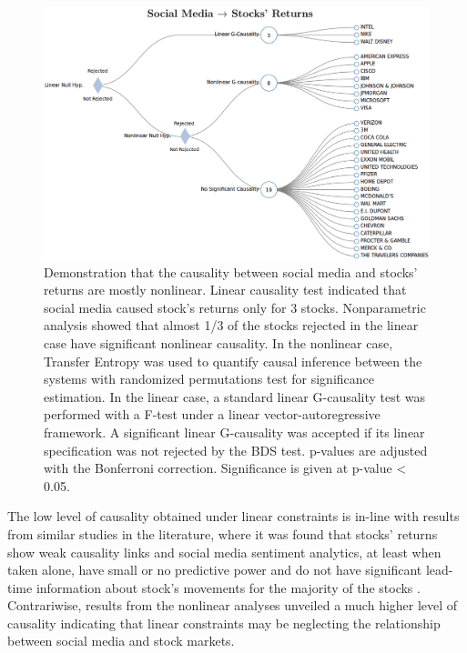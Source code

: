 \documentclass[]{book}
\theoremstyle{definition}
\theoremstyle{definition}
\theoremstyle{definition}
\theoremstyle{remark}
\begin{document}
\begin{figure}[H]

{\centering \includegraphics[width=1\linewidth]{./chapters/TransferEntropy/SM-R-33} 

}

\caption{Demonstration that the causality between social media and stocks' returns are mostly nonlinear. Linear causality test indicated that social media caused stock's returns only for 3 stocks. Nonparametric analysis showed that almost 1/3 of the stocks rejected in the linear case have significant nonlinear causality. In the nonlinear case, Transfer Entropy was used to quantify causal inference between the systems with randomized permutations test for significance estimation. In the linear case, a standard linear G-causality test was performed with a F-test under a linear vector-autoregressive framework. A significant linear G-causality was accepted if its linear specification was not rejected by the BDS test. p-values are adjusted with the Bonferroni correction. Significance is given at p-value  < 0.05.}\label{fig:sigpoints-0}
\end{figure}

The low level of causality obtained under linear constraints is in-line
with results from similar studies in the literature, where it was found
that stocks' returns show weak causality links
\citep[\citet{Antweiler+Frank:04a}]{Tobias:2013} and social media
sentiment analytics, at least when taken alone, have small or no
predictive power \citep{10.1371/journal.pone.0138441} and do not have
significant lead-time information about stock's movements for the
majority of the stocks \citep{citeulike:13108056}. Contrariwise, results
from the nonlinear analyses unveiled a much higher level of causality
indicating that linear constraints may be neglecting the relationship
between social media and stock markets.
\end{document}
